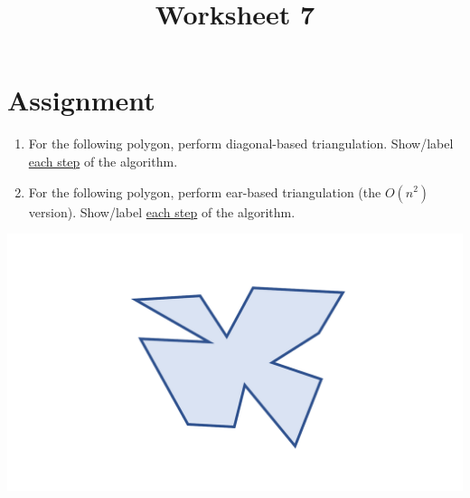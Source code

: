 \documentclass[a4paper,12pt]{article}
\title{Worksheet 7}
\begin{document}
\maketitle

\worksheetGroundRules

\worksheetSubmission


\vspace{5pt}
\section{Assignment}

\begin{enumerate}
\item For the following polygon, perform diagonal-based triangulation. Show/label \uline{each step} of the algorithm. 
\item For the following polygon, perform ear-based triangulation (the $O(n^2)$ version). Show/label \uline{each step} of the algorithm. 
\end{enumerate}

\begin{center}
\includegraphics[width=0.75\linewidth]{../images/worksheet3.pdf}
\end{center}



\newpage
\end{document}
